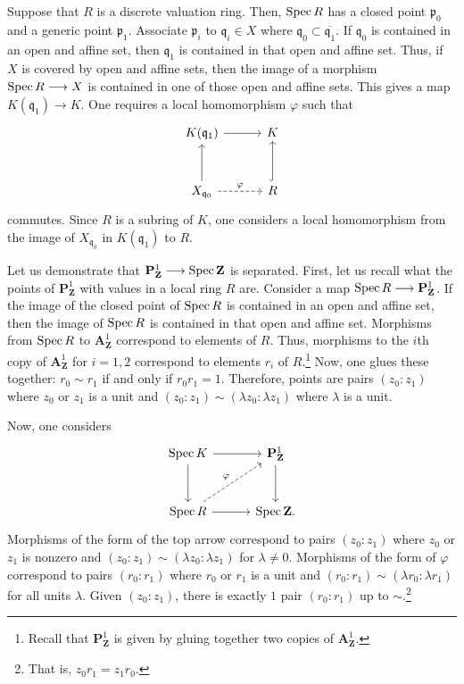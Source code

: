 \documentclass [11 pt, oneside] {article}
\begin{document}
Suppose that $R$ is a discrete valuation ring. Then, $\operatorname{Spec} R$ has a closed point $\mathfrak{p}_0$ and a generic point $\mathfrak{p}_1$. Associate $\mathfrak{p}_i$ to $\mathfrak{q}_i\in X$ where $\mathfrak{q}_0\subset \overline{\mathfrak{q}_1}$. If $\mathfrak{q}_0$ is contained in an open and affine set, then $\mathfrak{q}_1$ is contained in that open and affine set. Thus, if $X$ is covered by open and affine sets, then the image of a morphism $\operatorname{Spec} R\longrightarrow X$ is contained in one of those open and affine sets. This gives a map $K(\mathfrak{q}_1)\longrightarrow K$. One requires a local homomorphism $\varphi$ such that
\[
\begin{tikzcd}[column sep = 3 em, row sep = 3 em]
	K(\mathfrak{q}_1)\ar[r]&K\\ X_{\mathfrak{q}_0} \ar[u] \ar[r,dashed,"\varphi"] &R\ar[u,hookrightarrow]
\end{tikzcd}
\]
commutes. Since $R$ is a subring of $K$, one considers a local homomorphism from the image of $X_{\mathfrak{q}_0}$ in $K(\mathfrak{q}_1)$ to $R$.

\begin{example}[ ]\label{}\text{}
Let us demonstrate that $\mathbf{P}^1_{\mathbf{Z}}\longrightarrow \operatorname{Spec} \mathbf{Z}$ is separated. First, let us recall what the points of $\mathbf{P}^1_{\mathbf{Z}}$ with values in a local ring $R$ are. Consider a map $\operatorname{Spec} R\longrightarrow \mathbf{P}^1_{\mathbf{Z}}$. If the image of the closed point of $\operatorname{Spec} R$ is contained in an open and affine set, then the image of $\operatorname{Spec} R$ is contained in that open and affine set. Morphisms from $\operatorname{Spec} R$ to $\mathbf{A}^1_{\mathbf{Z}}$ correspond to elements of $R$. 
Thus, morphisms to the $i$th copy of $\mathbf{A}^1_{\mathbf{Z}}$ for $i=1,2$ correspond to elements $r_i$ of $R$.\footnote{Recall that $\mathbf{P}^1_{\mathbf{Z}}$ is given by gluing together two copies of $\mathbf{A}^1_{\mathbf{Z}}$.} Now, one glues these together: $r_0\sim r_1$ if and only if $r_0r_1 = 1$. Therefore, points are pairs $(z_0:z_1)$ where $z_0$ or $z_1$ is a unit and $(z_0:z_1)\sim (\lambda z_0:\lambda z_1)$ where $\lambda$ is a unit.

Now, one considers
\[
\begin{tikzcd}[column sep = 3 em, row sep = 3 em]
	\Spec K \ar[r]\ar[d] & \mathbf{P}^1_{\mathbf{Z}}\ar[d]\\
	\Spec R \ar[r]\ar[ur,dashed,"\varphi"] &\Spec \mathbf{Z}.
\end{tikzcd}
\]
Morphisms of the form of the top arrow correspond to pairs $(z_0:z_1)$ where $z_0$ or $z_1$ is nonzero and $(z_0:z_1)\sim(\lambda z_0:\lambda z_1)$ for $\lambda\ne 0$. Morphisms of the form of $\varphi$ correspond to pairs $(r_0:r_1)$ where $r_0$ or $r_1$ is a unit and $(r_0:r_1)\sim(\lambda r_0:\lambda r_1)$ for all units $\lambda$.
Given $(z_0:z_1)$, there is exactly $1$ pair $(r_0:r_1)$ up to $\sim$.\footnote{That is, $z_0r_1 = z_1r_0$.}
\end{example}
\end{document}
